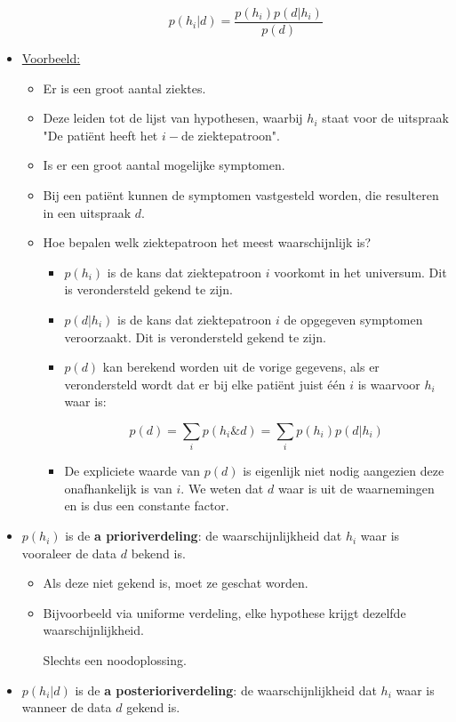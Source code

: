 \begin{itemize}
\begin{itemize}
		$$p(h_i|d) = \frac{p(h_i)p(d|h_i)}{p(d)}$$
	\end{itemize}
	\item \underline{Voorbeeld:}
	\begin{itemize}
		\item Er is een groot aantal ziektes.
		\item Deze leiden tot de lijst van hypothesen, waarbij $h_i$ staat voor de uitspraak "De patiënt heeft het $i-$de ziektepatroon".
		\item Is er een groot aantal mogelijke symptomen.
		\item Bij een patiënt kunnen de symptomen vastgesteld worden, die resulteren in een uitspraak $d$.
		\item Hoe bepalen welk ziektepatroon het meest waarschijnlijk is?
		\begin{itemize}
			\item $p(h_i)$ is de kans dat ziektepatroon $i$ voorkomt in het universum. Dit is verondersteld gekend te zijn.
			\item $p(d|h_i)$ is de kans dat ziektepatroon $i$ de opgegeven symptomen veroorzaakt. Dit is verondersteld gekend te zijn.
			\item $p(d)$ kan berekend worden uit de vorige gegevens, als er verondersteld wordt dat er bij elke patiënt juist één $i$ is waarvoor $h_i$ waar is:
			
			$$p(d) = \sum_i p(h_i\&d) = \sum_i p(h_i)p(d|h_i)$$
			
			\item De expliciete waarde van $p(d)$ is eigenlijk niet nodig aangezien deze onafhankelijk is van $i$. We weten dat $d$ waar is uit de waarnemingen en is dus een constante factor.
		\end{itemize}
	\end{itemize}
	\item $p(h_i)$ is de \textbf{a prioriverdeling}: de waarschijnlijkheid dat $h_i$ waar is vooraleer de data $d$ bekend is.
	\begin{itemize}
		\item Als deze niet gekend is, moet ze geschat worden.
		\item Bijvoorbeeld via uniforme verdeling, elke hypothese krijgt dezelfde waarschijnlijkheid.
		\begin{itemize}
			\alert Slechts een noodoplossing.
		\end{itemize}
	\end{itemize}
	\item $p(h_i|d)$ is de \textbf{a posterioriverdeling}: de waarschijnlijkheid dat $h_i$ waar is wanneer de data $d$ gekend is.	
\end{itemize}
